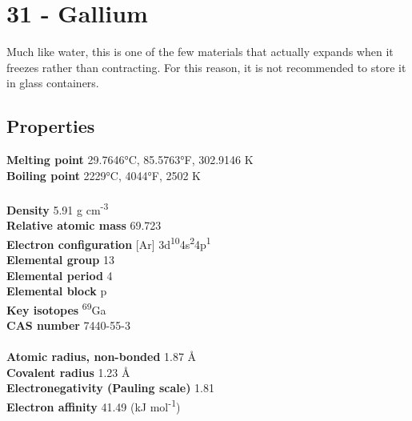 \section{31 - Gallium}
\label{sec:elem-gallium}
Much like water, this is one of the few materials that actually expands when it freezes rather than contracting.  For this reason, it is not recommended to store it in glass containers.
\subsection{Properties}
\textbf{Melting point} 29.7646°C, 85.5763°F, 302.9146 K\\
\textbf{Boiling point} 2229°C, 4044°F, 2502 K\\
\\
\textbf{Density} 5.91 g cm\textsuperscript{-3}\\
\textbf{Relative atomic mass} 69.723\\
\textbf{Electron configuration} [Ar] 3d\textsuperscript{10}4s\textsuperscript{2}4p\textsuperscript{1}\\
\textbf{Elemental group} 13\\
\textbf{Elemental period} 4\\
\textbf{Elemental block} p\\
\textbf{Key isotopes} \textsuperscript{69}Ga\\
\textbf{CAS number} 7440-55-3\\
\\
\textbf{Atomic radius, non-bonded} 1.87 Å\\
\textbf{Covalent radius} 1.23 Å\\
\textbf{Electronegativity (Pauling scale)} 1.81\\
\textbf{Electron affinity} 41.49 (kJ mol\textsuperscript{-1})\\